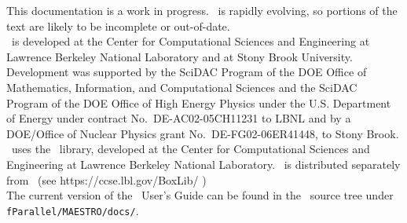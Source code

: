 This documentation is a work in progress.  \maestro\ is rapidly
evolving, so portions of the text are likely to be incomplete or
out-of-date. \\

\noindent \maestro\ is developed at the Center for Computational Sciences and
Engineering at Lawrence Berkeley National Laboratory and at Stony
Brook University.  Development was supported by the SciDAC Program of
the DOE Office of Mathematics, Information, and Computational Sciences
and the SciDAC Program of the DOE Office of High Energy Physics under
the U.S. Department of Energy under contract No.\ DE-AC02-05CH11231 to
LBNL and by a DOE/Office of Nuclear Physics grant No.\
DE-FG02-06ER41448, to Stony Brook.  \\

\noindent \maestro\ uses the \boxlib\ library,
developed at the Center for Computational Sciences and
Engineering at Lawrence Berkeley National Laboratory.  \boxlib\
is distributed separately from \maestro\ (see https:/\hspace{-0.25em}/ccse.lbl.gov/BoxLib/ )
\\

\noindent The current version of the \maestro\ User's Guide can be found in 
the \maestro\ source tree under {\tt fParallel/MAESTRO/docs/}.
